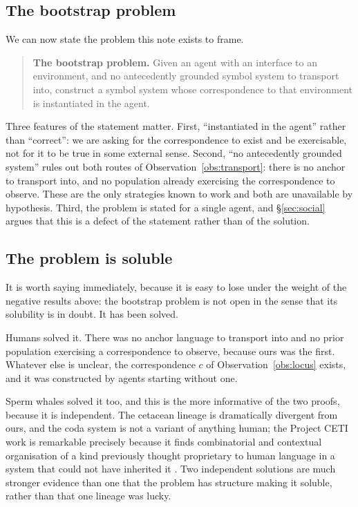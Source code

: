 \documentclass[11pt,a4paper]{article}
\theoremstyle{definition}
\theoremstyle{plain}
\theoremstyle{remark}
\begin{document}
\subsection{The bootstrap problem}

We can now state the problem this note exists to frame.

\begin{quote}
\textbf{The bootstrap problem.} Given an agent with an interface to an environment, and
no antecedently grounded symbol system to transport into, construct a symbol system whose
correspondence to that environment is instantiated in the agent.
\end{quote}

Three features of the statement matter. First, ``instantiated in the agent'' rather than
``correct'': we are asking for the correspondence to exist and be exercisable, not for it
to be true in some external sense. Second, ``no antecedently grounded system'' rules out
both routes of Observation~\ref{obs:transport}: there is no anchor to transport into, and
no population already exercising the correspondence to observe. These are the only
strategies known to work and both are unavailable by hypothesis. Third, the problem is
stated for a single agent,
and \S\ref{sec:social} argues that this is a defect of the statement rather than of the
solution.

\subsection{The problem is soluble}
\label{sec:soluble}

It is worth saying immediately, because it is easy to lose under the weight of the
negative results above: the bootstrap problem is not open in the sense that its solubility
is in doubt. It has been solved.

Humans solved it. There was no anchor language to transport into and no prior population
exercising a correspondence to observe, because ours was the first. Whatever else is
unclear, the correspondence $c$ of Observation~\ref{obs:locus} exists, and it was
constructed by agents starting without one.

Sperm whales solved it too, and this is the more informative of the two proofs, because it
is independent. The cetacean lineage is dramatically divergent from ours, and the coda
system is not a variant of anything human; the Project CETI work is remarkable precisely
because it finds combinatorial and contextual organisation of a kind previously thought
proprietary to human language in a system that could not have inherited it
\cite{sharma2024,begus2026}. Two independent solutions are much stronger evidence than one
that the problem has structure making it soluble, rather than that one lineage was lucky.
\end{document}
